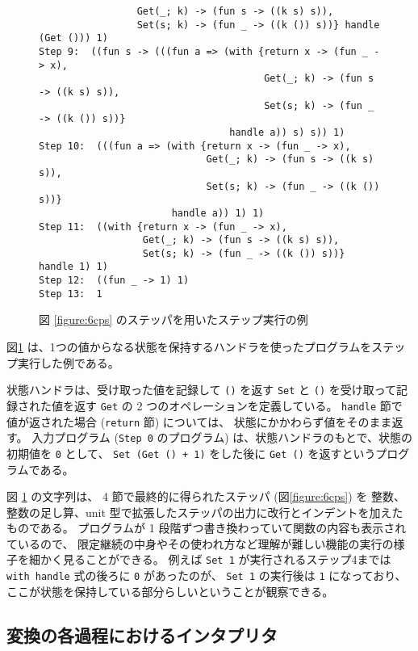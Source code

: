 \begin{figure}
\begin{spacing}{0.8}
\begin{verbatim}
                 Get(_; k) -> (fun s -> ((k s) s)),
                 Set(s; k) -> (fun _ -> ((k ()) s))} handle (Get ())) 1)
Step 9:  ((fun s -> (((fun a => (with {return x -> (fun _ -> x),
                                       Get(_; k) -> (fun s -> ((k s) s)),
                                       Set(s; k) -> (fun _ -> ((k ()) s))}
                                 handle a)) s) s)) 1)
Step 10:  (((fun a => (with {return x -> (fun _ -> x),
                             Get(_; k) -> (fun s -> ((k s) s)),
                             Set(s; k) -> (fun _ -> ((k ()) s))}
                       handle a)) 1) 1)
Step 11:  ((with {return x -> (fun _ -> x),
                  Get(_; k) -> (fun s -> ((k s) s)),
                  Set(s; k) -> (fun _ -> ((k ()) s))} handle 1) 1)
Step 12:  ((fun _ -> 1) 1)
Step 13:  1
\end{verbatim}
\end{spacing}
\caption{図 \ref{figure:6cps} のステッパを用いたステップ実行の例}
\label{figure:step_example}
\end{figure}

図\ref{figure:step_example} は、1つの値からなる状態を保持するハンドラを使ったプログラムをステップ実行した例である。

状態ハンドラは、受け取った値を記録して \texttt{()} を返す \texttt{Set} と
\texttt{()} を受け取って記録された値を返す \texttt{Get} の 2 つのオペレーションを定義している。
\texttt{handle} 節で値が返された場合 (\texttt{return} 節) については、
状態にかかわらず値をそのまま返す。
入力プログラム (\texttt{Step 0} のプログラム) は、状態ハンドラのもとで、状態の初期値を \texttt{0} として、
\texttt{Set (Get () + 1)} をした後に \texttt{Get ()} を返すというプログラムである。

図 \ref{figure:step_example} の文字列は、
4 節で最終的に得られたステッパ (図\ref{figure:6cps}) を
整数、整数の足し算、unit 型で拡張したステッパの出力に改行とインデントを加えたものである。
プログラムが 1 段階ずつ書き換わっていて関数の内容も表示されているので、
限定継続の中身やその使われ方など理解が難しい機能の実行の様子を細かく見ることができる。
例えば \texttt{Set 1} が実行されるステップ4までは \texttt{with handle} 式の後ろに \texttt{0} があったのが、
\texttt{Set 1} の実行後は \texttt{1} になっており、ここが状態を保持している部分らしいということが観察できる。

\newpage

\subsection{変換の各過程におけるインタプリタ}

